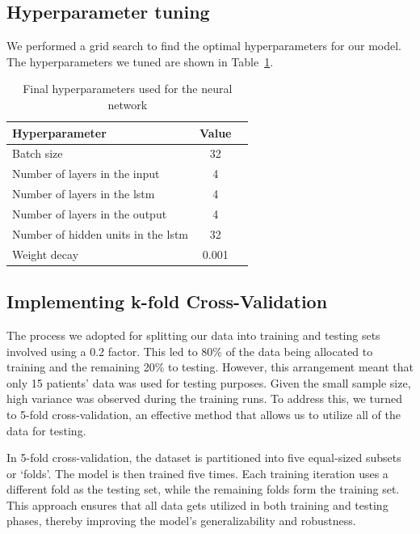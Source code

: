 \subsection{Hyperparameter tuning}

We performed a grid search to find the optimal hyperparameters for our model.
The hyperparameters we tuned are shown in
Table~\ref{tab:final-hyperparameters}.

\begin{table}[h]
	\centering
	\begin{tabular}{l c c}
		\toprule
		\textbf{Hyperparameter}                  & \textbf{Value} \\
		\midrule
		Batch size                               & 32             \\
		Number of layers in the input            & 4              \\
		Number of layers in the \gls{lstm}       & 4              \\
		Number of layers in the output           & 4              \\
		Number of hidden units in the \gls{lstm} & 32             \\
		Weight decay                             & 0.001          \\
		\bottomrule
	\end{tabular}
	\caption{Final hyperparameters used for the neural network}
	\label{tab:final-hyperparameters}
\end{table}

\subsection{Implementing k-fold Cross-Validation}

The process we adopted for splitting our data into training and testing sets
involved using a 0.2 factor. This led to 80\% of the data being allocated to
training and the remaining 20\% to testing. However, this arrangement meant
that only 15 patients' data was used for testing purposes. Given the small
sample size, high variance was observed during the training runs. To address
this, we turned to 5-fold cross-validation, an effective method that allows us
to utilize all of the data for testing.

In 5-fold cross-validation, the dataset is partitioned into five equal-sized
subsets or `folds'. The model is then trained five times. Each training
iteration uses a different fold as the testing set, while the remaining folds
form the training set. This approach ensures that all data gets utilized in
both training and testing phases, thereby improving the model's
generalizability and robustness.

